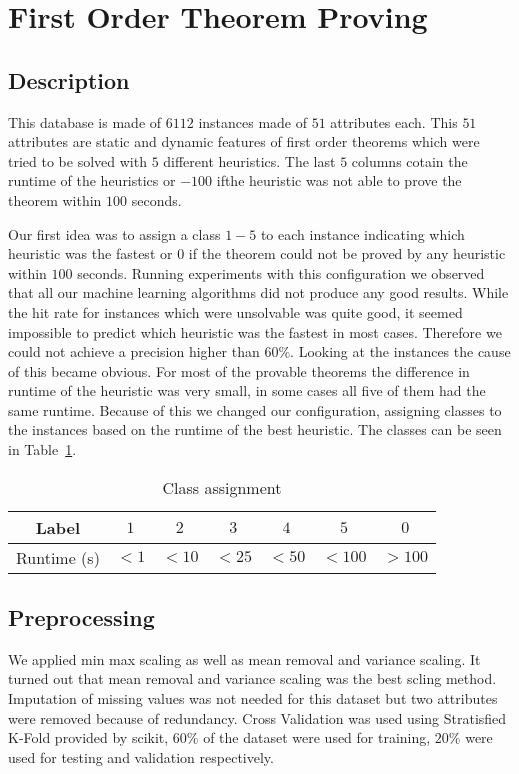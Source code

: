 \section{First Order Theorem Proving}
\label{db:sec:ds2}
\subsection{Description}
This database is made of $6112$ instances made of $51$ attributes each. This $51$ attributes are static and dynamic features of first order theorems which were tried to be solved with $5$ different heuristics. The last $5$ columns cotain the runtime of the heuristics or $-100$ ifthe heuristic was not able to prove the theorem within $100$ seconds.\par
Our first idea was to assign a class $1-5$ to each instance indicating which heuristic was the fastest or $0$ if the theorem could not be proved by any heuristic within $100$ seconds. Running experiments with this configuration we observed that all our machine learning algorithms did not produce any good results. While the hit rate for instances which were unsolvable was quite good, it seemed impossible to predict which heuristic was the fastest in most cases. Therefore we could not achieve a precision higher than $60\%$.
Looking at the instances the cause of this became obvious. For most of the provable theorems the difference in runtime of the heuristic was very small, in some cases all five of them had the same runtime. Because of this we changed our configuration, assigning classes to the instances based on the runtime of the best heuristic. The classes can be seen in Table~\ref{ds2:table:classes}.
\begin{table}[h]
	\begin{center}
	\begin{tabular}{c|c|c|c|c|c|c}

		Label & $1$ & $2$ & $3$ & $4$ & $5$& $0$\\\hline
		Runtime (s) & $<1$ & $<10$ & $<25$ & $<50$ &$<100$ &$>100$\\
	\end{tabular}
\end{center}
	\caption{Class assignment \label{ds2:table:classes}}
\end{table}
\subsection{Preprocessing}
We applied min max scaling as well as mean removal and variance scaling. It turned out that mean removal and variance scaling was the best scling method. Imputation of missing values was not needed for this dataset but two attributes were removed because of redundancy. Cross Validation was used using Stratisfied K-Fold provided by scikit, $60\%$ of the dataset were used for training, $20\%$ were used for testing and validation respectively. 
